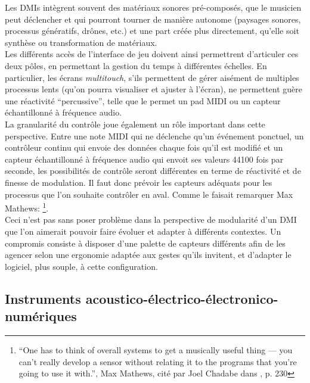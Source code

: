 \noindent Les \glspl{DMI} intègrent souvent des matériaux sonores pré-composés, que le musicien peut déclencher et qui pourront tourner de manière autonome (paysages sonores, processus génératifs, drônes, etc.) et une part créée plus directement, qu'elle soit synthèse ou transformation de matériaux.\\
\indent Les différents accès de l'interface de jeu doivent ainsi permettrent d'articuler ces deux pôles, en permettant la gestion du temps à différentes échelles. En particulier, les écrans \textit{multitouch}, s'ils permettent de gérer aisément de multiples processus lents (qu'on pourra visualiser et ajuster à l'écran), ne permettent guère une réactivité ``percussive'', telle que le permet un pad \gls{MIDI} ou un capteur échantillonné à fréquence audio.\\
\indent La granularité du contrôle joue également un rôle important dans cette perspective. Entre une note \gls{MIDI} qui ne déclenche qu'un événement ponctuel, un contrôleur continu qui envoie des données chaque fois qu'il est modifié et un capteur échantillonné à fréquence audio qui envoit ses valeurs 44100 fois par seconde, les possibilités de contrôle seront différentes en terme de réactivité et de finesse de modulation. Il faut donc prévoir les capteurs adéquats pour les processus que l'on souhaite contrôler en aval. Comme le faisait remarquer Max Mathews: \footnote{``One has to think of overall systems to get a musically useful thing — you can't really develop a sensor without relating it to the programs that you're going to use it with.'', Max Mathews, cité par Joel Chadabe dans \cite{chadabe_electric_1996}, p. 230}.\\
\indent Ceci n'est pas sans poser problème dans la perspective de modularité d'un \gls{DMI} que l'on aimerait pouvoir faire évoluer et adapter à différents contextes. Un compromis consiste à disposer d'une palette de capteurs différents afin de les agencer selon une ergonomie adaptée aux gestes qu'ils invitent, et d'adapter le logiciel, plus souple, à cette configuration.

\subsection{Instruments acoustico-électrico-électronico-numériques}

